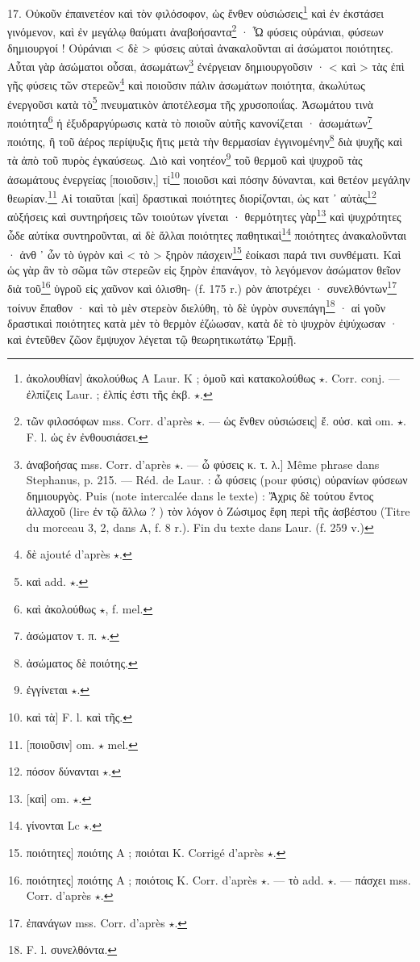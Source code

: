 \documentclass[a4paper, 11pt, oneside, polutonikogreek, french]{article}
\begin{document}
17. Οὐκοῦν ἐπαινετέον καὶ τὸν φιλόσοφον, ὡς ἔνθεν οὐσιώσεις\footnote{ἀκολουθίαν] ἀκολούθως A Laur. K ; ὁμοῦ καὶ κατακολούθως $\star$. Corr. conj. --- ἐλπίζεις Laur. ; ἐλπίς ἐστι τῆς ἐκβ. $\star$.} καὶ ἐν ἐκστάσει γινόμενον, καὶ ἐν μεγάλῳ θαύματι ἀναβοήσαντα\footnote{τῶν φιλοσόφων mss. Corr. d'après $\star$. --- ὡς ἔνθεν οὐσιώσεις] ἔ. οὐσ. καὶ om. $\star$. F. l. ὡς ἐν ἐνθουσιάσει.} · Ὦ φύσεις οὐράνιαι, φύσεων δημιουργοί ! Οὐράνιαι < δὲ > φύσεις αὐταὶ ἀνακαλοῦνται αἱ ἀσώματοι ποιότητες. Αὗται γὰρ ἀσώματοι οὖσαι, ἀσωμάτων\footnote{ἀναβοήσας mss. Corr. d'après $\star$. --- ὦ φύσεις κ. τ. λ.] Même phrase dans Stephanus, p. 215. --- Réd. de Laur. : ὦ φύσεις (pour φύσις) οὐρανίων φύσεων δημιουργὸς. Puis (note intercalée dans le texte) : Ἄχρις δὲ τούτου ἔντος ἀλλαχοῦ (lire ἐν τῷ ἄλλω ? ) τὸν λόγον ὁ Ζώσιμος ἔφη περὶ τῆς ἀσβέστου (Titre du morceau 3, 2, dans A, f. 8 r.). Fin du texte dans Laur. (f. 259 v.)} ἐνέργειαν δημιουργοῦσιν · < καὶ > τὰς ἐπὶ γῆς φύσεις τῶν στερεῶν\footnote{δὲ ajouté d'après $\star$.} καὶ ποιοῦσιν πάλιν ἀσωμάτων ποιότητα, ἀκωλύτως ἐνεργοῦσι κατὰ τὸ\footnote{καὶ add. $\star$.} πνευματικὸν ἀποτέλεσμα τῆς χρυσοποιΐας. Ἀσωμάτου τινὰ ποιότητα\footnote{καὶ ἀκολούθως $\star$, f. mel.} ἡ ἐξυδραργύρωσις κατὰ τὸ ποιοῦν αὐτῆς κανονίζεται · ἀσωμάτων\footnote{ἀσώματον τ. π. $\star$.} ποιότης, ἢ τοῦ ἀέρος περίψυξις ἥτις μετὰ τὴν θερμασίαν ἐγγινομένην\footnote{ἀσώματος δὲ ποιότης.} διὰ ψυχῆς καὶ τὰ ἀπὸ τοῦ πυρὸς ἐγκαύσεως. Διὸ καὶ νοητέον\footnote{ἐγγίνεται $\star$.} τοῦ θερμοῦ καὶ ψυχροῦ τὰς ἀσωμάτους ἐνεργείας [ποιοῦσιν,] τί\footnote{καὶ τὰ] F. l. καὶ τῆς.} ποιοῦσι καὶ πόσην δύνανται, καὶ θετέον μεγάλην θεωρίαν.\footnote{[ποιοῦσιν] om. $\star$ mel.} Αἱ τοιαῦται [καὶ] δραστικαὶ ποιότητες διορίζονται, ὡς κατ ᾽ αὐτὰς\footnote{πόσον δύνανται $\star$.} αὐξήσεις καὶ συντηρήσεις τῶν τοιούτων γίνεται · θερμότητες γὰρ\footnote{[καὶ] om. $\star$.} καὶ ψυχρότητες ὧδε αὐτίκα συντηροῦνται, αἱ δὲ ἄλλαι ποιότητες παθητικαὶ\footnote{γίνονται Lc $\star$.} ποιότητες ἀνακαλοῦνται · ἀνθ ᾽ ὧν τὸ ὑγρὸν καὶ < τὸ > ξηρὸν πάσχειν\footnote{ποιότητες] ποιότης A ; ποιόται K. Corrigé d'après $\star$.} ἐοίκασι παρά τινι συνθέματι. Καὶ ὡς γὰρ ἂν τὸ σῶμα τῶν στερεῶν εἰς ξηρὸν ἐπανάγον, τὸ λεγόμενον ἀσώματον θεῖον διὰ τοῦ\footnote{ποιότητες] ποιότης A ; ποιότοις K. Corr. d'après $\star$. --- τὸ add. $\star$. --- πάσχει mss. Corr. d'après $\star$.} ὑγροῦ εἰς χαῦνον καὶ ὀλισθη- (f. 175 r.) ρὸν ἀποτρέχει · συνελθόντων\footnote{ἐπανάγων mss. Corr. d'après $\star$.} τοίνυν ἔπαθον · καὶ τὸ μὲν στερεὸν διελύθη, τὸ δὲ ὑγρὸν συνεπάγη\footnote{F. l. συνελθόντα.} · αἱ γοῦν δραστικαὶ ποιότητες κατὰ μὲν τὸ θερμὸν ἐζώωσαν, κατὰ δὲ τὸ ψυχρὸν ἐψύχωσαν · καὶ ἐντεῦθεν ζῶον ἔμψυχον λέγεται τῷ θεωρητικωτάτῳ Ἑρμῇ.
\end{document}
